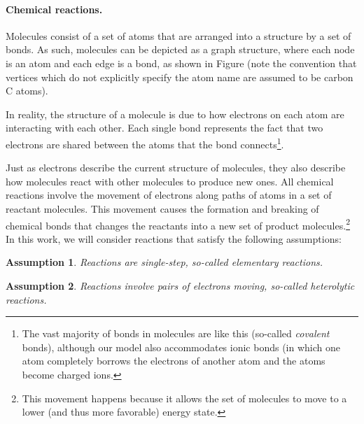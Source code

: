 \documentclass{article}
\newtheorem{assumption}{Assumption}
\begin{document}
\paragraph{Chemical reactions.}
Molecules consist of a set of atoms that are arranged into a structure by a set of bonds. 
As such, molecules can be depicted as a graph structure, where each node is an atom and each edge is a bond, 
as shown in Figure (note the convention that vertices which do not explicitly specify the atom name are assumed to be carbon C atoms). 

In reality, the structure of a molecule is due to how electrons on each atom are interacting with each other. 
Each single bond represents the fact that two electrons are shared between the atoms that the bond connects\footnote{The vast majority of bonds in molecules are like this (so-called \emph{covalent} bonds), 
although our model also accommodates ionic bonds 
(in which one atom completely borrows the electrons of another atom and the atoms become charged ions.}.

Just as electrons describe the current structure of molecules, they also describe how molecules react with other molecules to produce new ones. All chemical reactions involve the movement of electrons along paths of atoms in a set of reactant molecules. This movement causes the formation and breaking of chemical bonds that changes the reactants into a new set of product molecules.\footnote{This movement happens because it allows the set of molecules to move to a lower (and thus more favorable) energy state.} In this work, we will consider reactions that satisfy the following assumptions:
\begin{assumption}
Reactions are single-step, so-called \emph{elementary} reactions.
\label{assume:elem}
\end{assumption}

\begin{assumption}
Reactions involve pairs of electrons moving, so-called \emph{heterolytic} reactions.
\label{assume:het}
\end{assumption}
\end{document}
